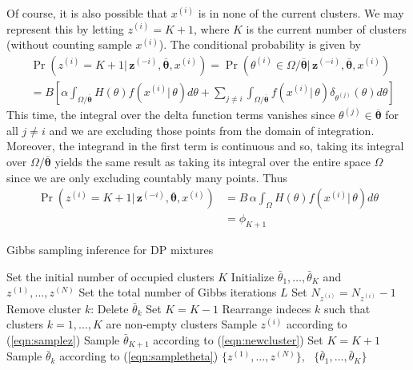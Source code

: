 \documentclass[final,3p,times,twocolumn]{elsarticle}
\DeclareMathOperator*{\Cat}{Cat}
\let\bs\boldsymbol
\begin{document}
Of course, it is also possible that $x^{(i)}$ is in none of the current clusters.
We may represent this by letting $z^{(i)} = K+1$, where $K$ is the current number of clusters (without counting sample $x^{(i)}$).
The conditional probability is given by 
\begin{equation}
\begin{split}
&\Pr(z^{(i)}=K+1|\,\bs z^{(-i)},\overline {\bs \theta},x^{(i)}) = \Pr(\theta^{(i)} \in \Omega/\bs{\overline \theta}|\,\bs z^{(-i)},\overline {\bs \theta},x^{(i)})\\
&= B\left[\alpha\int_{\Omega/\overline{\bs\theta}} H(\theta)f(x^{(i)}|\,\theta)d\theta + \sum_{j\neq i}\int_{\Omega/\overline{\bs\theta}}f(x^{(i)}|\,\theta)\delta_{\theta^{(j)}}(\theta)d\theta\right]
\end{split}
\end{equation}
This time, the integral over the delta function terms vanishes since $\theta^{(j)}\in \overline{\bs\theta}$ for all $j\neq i$ and we are excluding those points from the domain of integration.
Moreover, the integrand in the first term is continuous and so, taking its integral over $\Omega/\overline{\bs\theta}$ yields the same result as taking its integral over the entire space $\Omega$ since we are only excluding countably many points.
Thus
\begin{equation}
\label{eqn:phi_K+1}
\begin{split}
\Pr(z^{(i)}=K+1|\,\bs z^{(-i)},\overline {\bs \theta},x^{(i)}) &= B\, \alpha \int_\Omega H(\theta)f(x^{(i)}|\,\theta)d\theta\\
&= \phi_{K+1}
\end{split}
\end{equation}

\begin{algorithm}
\caption{Gibbs sampling inference for DP mixtures}
\begin{algorithmic}[1]
\State Set the initial number of occupied clusters $K$
\State Initialize $\bar \theta_1,\dots, \bar \theta_K$ and $z^{(1)},\dots,z^{(N)}$
\State Set the total number of Gibbs iterations $L$
\State Set $N_{z^{(i)}}=N_{z^{(i)}}-1$
\State Remove cluster $k$: Delete $\bar \theta_k$
\State Set $K = K - 1$
\State Rearrange indeces $k$ such that clusters 
\State \quad $k=1,\dots,K$ are non-empty clusters
\EndIf
\State Sample $z^{(i)}$ according to (\ref{eqn:samplez})%
\State Sample $\bar \theta_{K+1}$ according to (\ref{eqn:newcluster})
\State Set $K=K+1$
\EndIf
\EndFor
{}
\State Sample $\bar \theta_k$ according to (\ref{eqn:sampletheta})
\EndFor
\EndFor
\State\Return $\{z^{(1)},\dots,z^{(N)}\}$, \, $\{\bar \theta_1,\dots,\bar\theta_K\}$
\end{algorithmic}
\label{alg:gibbs2}
\end{algorithm}
\end{document}
